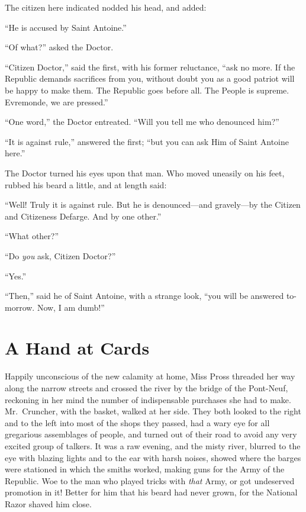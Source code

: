 The citizen here indicated nodded his head, and added:

``He is accused by Saint Antoine.''

``Of what?'' asked the Doctor.

``Citizen Doctor,'' said the first, with his former reluctance, ``ask no
more.  If the Republic demands sacrifices from you, without doubt you
as a good patriot will be happy to make them.  The Republic goes
before all.  The People is supreme.  Evremonde, we are pressed.''

``One word,'' the Doctor entreated.  ``Will you tell me who denounced him?''

``It is against rule,'' answered the first; ``but you can ask Him of
Saint Antoine here.''

The Doctor turned his eyes upon that man.  Who moved uneasily on his
feet, rubbed his beard a little, and at length said:

``Well!  Truly it is against rule.  But he is denounced---and
gravely---by the Citizen and Citizeness Defarge.  And by one other.''

``What other?''

``Do \emph{you} ask, Citizen Doctor?''

``Yes.''

``Then,'' said he of Saint Antoine, with a strange look, ``you will be
answered to-morrow.  Now, I am dumb!''



\chapter{A Hand at Cards}


Happily unconscious of the new calamity at home, Miss Pross threaded
her way along the narrow streets and crossed the river by the bridge
of the Pont-Neuf, reckoning in her mind the number of indispensable
purchases she had to make.  Mr.\ Cruncher, with the basket, walked at
her side.  They both looked to the right and to the left into most of
the shops they passed, had a wary eye for all gregarious assemblages
of people, and turned out of their road to avoid any very excited
group of talkers.  It was a raw evening, and the misty river, blurred
to the eye with blazing lights and to the ear with harsh noises,
showed where the barges were stationed in which the smiths worked,
making guns for the Army of the Republic.  Woe to the man who played
tricks with \emph{that} Army, or got undeserved promotion in it!  Better
for him that his beard had never grown, for the National Razor shaved
him close.

